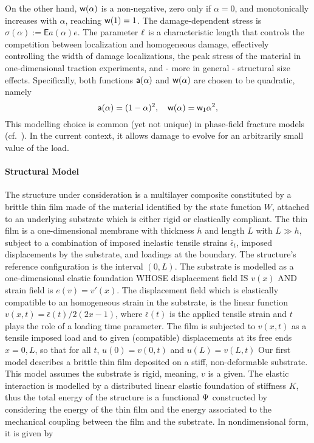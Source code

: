 On the other hand, $\mathsf{w}(\alpha)$ is a non-negative, zero only if $\alpha=0$, and monotonically increases with $\alpha$, reaching $\mathsf{w}(1)=1$. 
The damage-dependent stress is $\sigma(\alpha):=\mathsf{E}a(\alpha) e$. The parameter $\ell$ is a characteristic length that controls the competition between localization and homogeneous damage, effectively controlling the width of damage localizations, the peak stress of the material in one-dimensional traction experiments, and - more in general - structural size effects.
Specifically, both functions $\mathsf{a}(\alpha)$  
 and $\mathsf{w}(\alpha)$ are chosen to be quadratic, namely 
\begin{equation}
    \label{def:constitutive_functions}
    \mathsf{a}(\alpha) = (1-\alpha)^2, \quad \mathsf{w}(\alpha) = \mathsf{w_1}\alpha^2,
\end{equation}
This modelling choice is common (yet not unique) in phase-field fracture models (cf.~\cite{Bourdin2000-pc,Miehe2010-sj,Miehe2010-ja}). In the current context, it allows damage to evolve for an arbitrarily small value of the load. 




\paragraph{Structural Model}
The structure under consideration is a multilayer composite constituted by a brittle thin film  made of the material identified by the state function $W$, attached to an underlying substrate which is either rigid or elastically compliant. The thin film is a one-dimensional membrane with thickness $h$ and length $L$ with $L\gg h$, subject to a combination of imposed inelastic tensile strains $\bar\epsilon_t$, imposed displacements by the substrate, and loadings at the boundary. The structure's reference configuration is the interval $(0, L)$. 
% 
The substrate is modelled as a one-dimensional elastic foundation WHOSE displacement field IS $v(x)$ AND strain field is $e(v) = v'(x)$. 
% 
The displacement field which is elastically compatible to an homogeneous strain in the substrate, is the linear function $v(x, t) = \bar\epsilon(t)/2 (2x-1)$, where $\bar\epsilon(t)$ is the applied tensile strain and $t$ plays the role of a loading time parameter. 
% 
The film is subjected to $v(x, t)$ as a tensile imposed load and to given (compatible) displacements at its free ends $x = 0, L$, so that for all $t$, $u(0)=v(0, t)$ and $u(L)=v(L, t)$
% 
Our first model describes a brittle thin film deposited on a stiff, non-deformable substrate. This model assumes the substrate is rigid, meaning, $v$ is a given. The elastic interaction is modelled by a distributed linear elastic foundation of stiffness $K$, thus
the total energy of the structure is a functional $\Psi$ constructed by considering the energy of the thin film and the energy associated to the mechanical coupling between the film and the substrate. In nondimensional form, it is given by

